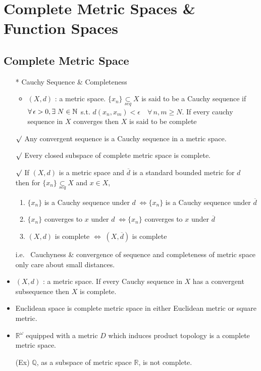 \documentclass[12pt]{article}
\newcommand{\rmk}{$\surd$}
\newcommand{\spone}{\hspace{0.1cm}}
\newcommand{\Nat}{\mathbb{N}}
\newcommand{\Real}{\mathbb{R}}
\newcommand{\seq}{\underset{seq}{\subset}}
\newcommand{\exist}{\exists\spone}
\begin{document}
\section{Complete Metric Spaces \& Function Spaces}
\bigskip
\subsection{Complete Metric Space}
\begin{itemize}
    \item[*] Cauchy Sequence \& Completeness
    \begin{itemize}
        \item $(X,d)$ : a metric space. $\{x_n\}\seq X$ is said to be a Cauchy sequence if $\forall \, \epsilon>0, \exist N\in \Nat$ s.t. $d(x_n, x_m)<\epsilon \quad \forall \, n,m\geq N$. If every cauchy sequence in $X$ converges then $X$ is said to be complete
    \end{itemize}
    \item[\rmk] Any convergent sequence is a Cauchy sequence in a metric space.
    \item[\rmk] Every closed subspace of complete metric space is complete.
    \item[\rmk] If $(X,d)$ is a metric space and $\overline{d}$ is a standard bounded metric for $d$ \\ then for $\{x_n\}\seq X$ and $x\in X$,
    \begin{enumerate}
        \item $\{x_n\}$ is a Cauchy sequence under $d\; \Leftrightarrow \{x_n\}$ is a Cauchy sequence under $\overline{d}$
        \item $\{x_n\}$ converges to $x$ under $d\; \Leftrightarrow \{x_n\}$ converges to $x$ under $\overline{d}$
        \item $(X,d)$ is complete $\Leftrightarrow \; (X,\overline{d})$ is complete
    \end{enumerate}
    i.e. \, Cauchyness \& convergence of sequence and completeness of metric space only care about small distances.
    \item $(X,d)$ : a metric space. If every Cauchy sequence in $X$ has a convergent subsequence then $X$ is complete.
    \item Euclidean space is complete metric space in either Euclidean metric or square metric.
    \item $\Real^\omega$ equipped with a metric $D$ which induces product topology is a complete metric space.
    \item[(Ex)]$\mathbb{Q}$, as a subspace of metric space $\Real$, is not complete.

\end{itemize}
\end{document}
